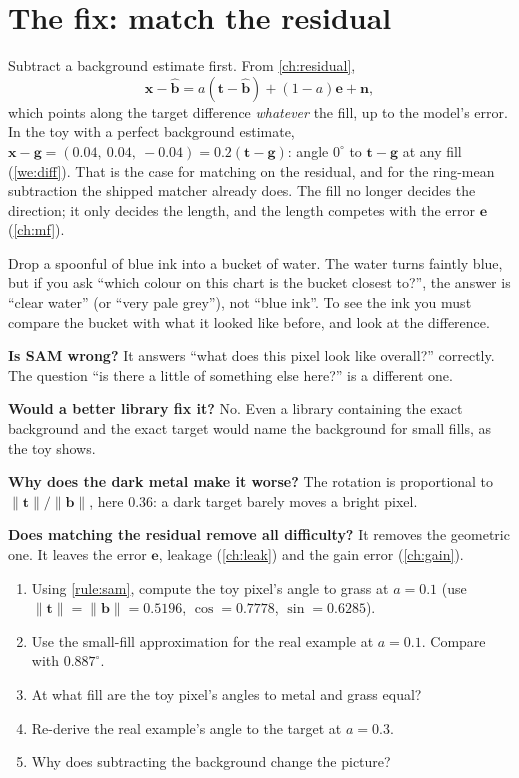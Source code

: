 \documentclass[11pt,a4paper,oneside,openany]{book}
\newcommand{\B}[1]{{\symbf{#1}}}
\newcommand{\B}[1]{{\bm{#1}}}
\newcommand{\nrm}[1]{\lVert #1\rVert}
\newcommand{\vx}{\B{x}}
\newcommand{\vt}{\B{t}}
\newcommand{\vb}{\B{b}}
\newcommand{\vbh}{\hat{\B{b}}}
\newcommand{\ve}{\B{e}}
\newcommand{\vn}{\B{n}}
\newcommand{\vg}{\B{g}}
\begin{document}
\section{The fix: match the residual}

Subtract a background estimate first. From \cref{ch:residual},
\[
  \vx-\vbh=a(\vt-\vbh)+(1-a)\ve+\vn,
\]
which points along the target difference \emph{whatever} the fill, up to the model's error. In the toy with a perfect background estimate,
$\vx-\vg=(0.04,\ 0.04,\ -0.04)=0.2(\vt-\vg)$: angle $0^\circ$ to $\vt-\vg$ at any fill (\cref{we:diff}). That is the case for matching on the residual, and for
the ring-mean subtraction the shipped matcher already does. The fill no longer decides the direction; it only decides the length, and the length
competes with the error $\ve$ (\cref{ch:mf}).

\begin{analogy}
Drop a spoonful of blue ink into a bucket of water. The water turns faintly blue, but if you ask ``which colour on this chart is the bucket closest
to?'', the answer is ``clear water'' (or ``very pale grey''), not ``blue ink''. To see the ink you must compare the bucket with what it looked like
before, and look at the difference.
\end{analogy}

\begin{confusions}
\textbf{Is SAM wrong?} It answers ``what does this pixel look like overall?'' correctly. The question ``is there a little of something else here?''
is a different one.

\textbf{Would a better library fix it?} No. Even a library containing the exact background and the exact target would name the background for small
fills, as the toy shows.

\textbf{Why does the dark metal make it worse?} The rotation is proportional to $\nrm{\vt}/\nrm{\vb}$, here $0.36$: a dark target barely moves a bright
pixel.

\textbf{Does matching the residual remove all difficulty?} It removes the geometric one. It leaves the error $\ve$, leakage (\cref{ch:leak}) and the
gain error (\cref{ch:gain}).
\end{confusions}

\begin{checkyourself}
\begin{enumerate}
\item Using \cref{rule:sam}, compute the toy pixel's angle to grass at $a=0.1$ (use $\nrm{\vt}=\nrm{\vb}=0.5196$, $\cos=0.7778$, $\sin=0.6285$).
\item Use the small-fill approximation for the real example at $a=0.1$. Compare with $0.887^\circ$.
\item At what fill are the toy pixel's angles to metal and grass equal?
\item Re-derive the real example's angle to the target at $a=0.3$.
\item Why does subtracting the background change the picture?
\end{enumerate}
\end{checkyourself}
\end{document}
